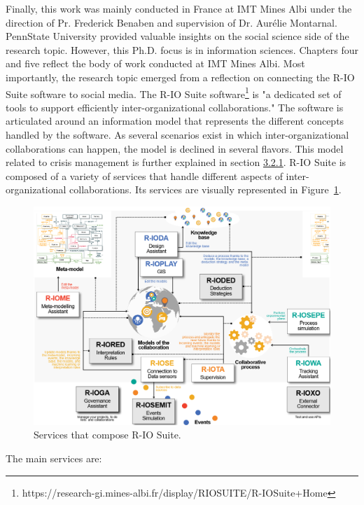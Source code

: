 Finally, this work was mainly conducted in France at IMT Mines Albi under the direction of Pr. Frederick Benaben and supervision of Dr. Aurélie Montarnal.
PennState University provided valuable insights on the social science side of the research topic.
However, this Ph.D. focus is in information sciences.
Chapters four and five reflect the body of work conducted at IMT Mines Albi.
Most importantly, the research topic emerged from a reflection on connecting the R-IO Suite software to social media.
The R-IO Suite software\footnote{https://research-gi.mines-albi.fr/display/RIOSUITE/R-IOSuite+Home} is "a dedicated set of tools to support efficiently inter-organizational collaborations."
The software is articulated around an information model that represents the different concepts handled by the software.
As several scenarios exist in which inter-organizational collaborations can happen, the model is declined in several flavors.
This model related to crisis management is further explained in section \hyperref[sec:crisismetamodel]{3.2.1}.
R-IO Suite is composed of a variety of services that handle different aspects of inter-organizational collaborations.
Its services are visually represented in Figure~\ref{context:rio-services}.

\begin{figure}[htb]
    \includegraphics[width=\textwidth,keepaspectratio]{figures/chap-1/rio-services.png}
    \caption{Services that compose R-IO Suite.}
    \label{context:rio-services}
\end{figure}

The main services are:

